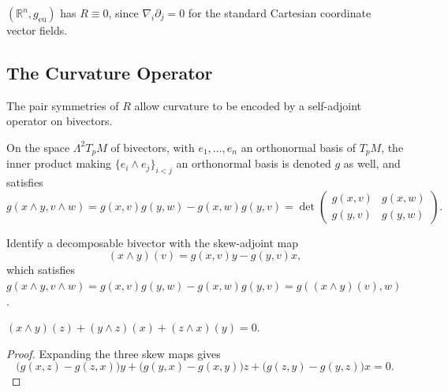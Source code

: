 \begin{example}
  \label{ex:pet-ch3-euclidean-flat}
  \leanok
  $(\mathbb R^n,g_{\mathrm{eu}})$ has $R\equiv0$, since $\nabla_i\partial_j=0$ for the
  standard Cartesian coordinate vector fields.
\end{example}

\subsection{The Curvature Operator}

The pair symmetries of $R$ allow curvature to be encoded by a self-adjoint
operator on bivectors.

\begin{definition}
  \label{def:pet-ch3-bivector-inner-product}
  \leanok
  On the space $\Lambda^2T_pM$ of bivectors, with $e_1,\dots,e_n$ an orthonormal
  basis of $T_pM$, the inner product making $\{e_i\wedge e_j\}_{i<j}$ an
  orthonormal basis is denoted $g$ as well, and satisfies
  \[
    g(x\wedge y,v\wedge w)=g(x,v)g(y,w)-g(x,w)g(y,v)
    =\det\begin{pmatrix}g(x,v)&g(x,w)\\g(y,v)&g(y,w)\end{pmatrix}.
  \]
\end{definition}

\begin{definition}
  \label{def:pet-ch3-bivector-skew-map}
  \leanok
  Identify a decomposable bivector with the skew-adjoint map
  \[
    (x\wedge y)(v)=g(x,v)y-g(y,v)x,
  \]
  which satisfies
  $g(x\wedge y,v\wedge w)=g(x,v)g(y,w)-g(x,w)g(y,v)=g((x\wedge y)(v),w)$.
\end{definition}

\begin{lemma}
  \label{lem:pet-ch3-bivector-jacobi-identity}
  \leanok
  $(x\wedge y)(z)+(y\wedge z)(x)+(z\wedge x)(y)=0$.
\end{lemma}
\begin{proof}
  \leanok
  \sketch
  Expanding the three skew maps gives
  \[
   \bigl(g(x,z)-g(z,x)\bigr)y+
   \bigl(g(y,x)-g(x,y)\bigr)z+
   \bigl(g(z,y)-g(y,z)\bigr)x=0.
  \]
\end{proof}

